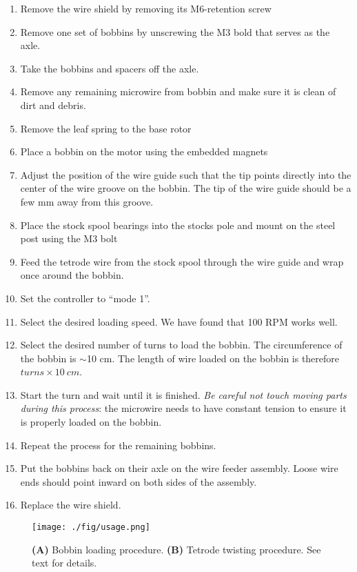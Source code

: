 \documentclass[11pt,a4paper]{article}
\begin{document}
\begin{enumerate}[noitemsep]
    \item Remove the wire shield by removing its M6-retention screw
    \item Remove one set of bobbins by unscrewing the M3 bold that serves as
        the axle.
    \item Take the bobbins and spacers off the axle.
    \item Remove any remaining microwire from bobbin and make sure it is clean
        of dirt and debris.
    \item Remove the leaf spring to the base rotor
    \item Place a bobbin on the motor using the embedded magnets
    \item Adjust the position of the wire guide such that the tip
        points directly into the center of the wire groove on the bobbin. The
        tip of the wire guide should be a few mm away from this groove.
    \item Place the stock spool bearings into the stocks pole and mount on the
        steel post using the M3 bolt
    \item Feed the tetrode wire from the stock spool through the wire guide and
        wrap once around the bobbin.
    \item Set the controller to ``mode 1''.
    \item Select the desired loading speed. We have found that 100 RPM works
        well.
    \item Select the desired number of turns to load the bobbin. The
        circumference of the bobbin is $\sim$10 cm. The length of wire loaded
        on the bobbin is therefore $turns \times 10\ cm$.
    \item Start the turn and wait until it is finished. \textit{Be careful not
        touch moving parts during this process}: the microwire needs to have
        constant tension to ensure it is properly loaded on the bobbin.
    \item Repeat the process for the remaining bobbins.
    \item Put the bobbins back on their axle on the wire feeder assembly. Loose
        wire ends should point inward on both sides of the assembly.
    \item Replace the wire shield.
\end{enumerate}

\begin{figure}
\centering
\texttt{[image: ./fig/usage.png]}
\caption{\textbf{(A)} Bobbin loading procedure. \textbf{(B)} Tetrode twisting procedure. See text for details.}
\label{f:ctrl-box}
\end{figure}
\end{document}
